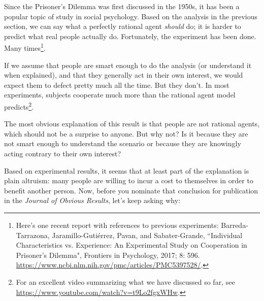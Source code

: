 \documentclass[12pt]{book}
\theoremstyle{exercise}
\begin{document}
Since the Prisoner's Dilemma was first discussed in the 1950s, it has been a popular topic of study in social psychology.  Based on the analysis in the previous section, we can say what a perfectly rational agent {\em should} do; it is harder to predict what real people actually do.  Fortunately, the experiment has been done.  Many times\footnote{Here's one recent report with references to previous experiments:
Barreda-Tarrazona, Jaramillo-Guti\'{e}rrez, Pavan, and Sabater-Grande,
``Individual Characteristics vs. Experience: An Experimental Study on Cooperation in Prisoner's Dilemma", Frontiers in Psychology, 2017; 8: 596.
\url{https://www.ncbi.nlm.nih.gov/pmc/articles/PMC5397528/}.}.

If we assume that people are smart enough to do the analysis (or understand it when explained), and that they generally act in their own interest, we would expect them to defect pretty much all the time.  But they don't.  In most experiments, subjects cooperate much more than the rational agent model predicts\footnote{For an excellent video summarizing what we have discussed so far, see \url{https://www.youtube.com/watch?v=t9Lo2fgxWHw}.}.

The most obvious explanation of this result is that people are not rational agents, which should not be a surprise to anyone.  But why not?  Is it because they are not smart enough to understand the scenario or because they are knowingly acting contrary to their own interest?

Based on experimental results, it seems that at least part of the explanation is plain altruism: many people are willing to incur a cost to themselves in order to benefit another person.  Now, before you nominate that conclusion for publication in the {\it Journal of Obvious Results}, let's keep asking why:
\end{document}
